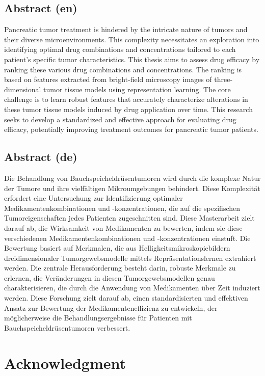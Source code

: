 \documentclass[12pt,twoside,a4paper,parskip]{scrbook} %
\begin{document}
\section*{Abstract (en)}
Pancreatic tumor treatment is hindered by the intricate nature of tumors and their diverse microenvironments. This complexity necessitates an exploration into identifying optimal drug combinations and concentrations tailored to each patient's specific tumor characteristics. This thesis aims to assess drug efficacy by ranking these various drug combinations and concentrations. The ranking is based on features extracted from bright-field microscopy images of three-dimensional tumor tissue models using representation learning. The core challenge is to learn robust features that accurately characterize alterations in these tumor tissue models induced by drug application over time. This research seeks to develop a standardized and effective approach for evaluating drug efficacy, potentially improving treatment outcomes for pancreatic tumor patients.

\section*{Abstract (de)}
Die Behandlung von Bauchspeicheldrüsentumoren wird durch die komplexe Natur der Tumore und ihre vielfältigen Mikroumgebungen behindert. Diese Komplexität erfordert eine Untersuchung zur Identifizierung optimaler Medikamentenkombinationen und -konzentrationen, die auf die spezifischen Tumoreigenschaften jedes Patienten zugeschnitten sind. Diese Masterarbeit zielt darauf ab, die Wirksamkeit von Medikamenten zu bewerten, indem sie diese verschiedenen Medikamentenkombinationen und -konzentrationen einstuft. Die Bewertung basiert auf Merkmalen, die aus Helligkeitsmikroskopiebildern dreidimensionaler Tumorgewebsmodelle mittels Repräsentationslernen extrahiert werden. Die zentrale Herausforderung besteht darin, robuste Merkmale zu erlernen, die Veränderungen in diesen Tumorgewebsmodellen genau charakterisieren, die durch die Anwendung von Medikamenten über Zeit induziert werden. Diese Forschung zielt darauf ab, einen standardisierten und effektiven Ansatz zur Bewertung der Medikamenteneffizienz zu entwickeln, der möglicherweise die Behandlungsergebnisse für Patienten mit Bauchspeicheldrüsentumoren verbessert.

\newpage
\chapter*{Acknowledgment}
\vspace{1em}
\end{document}
